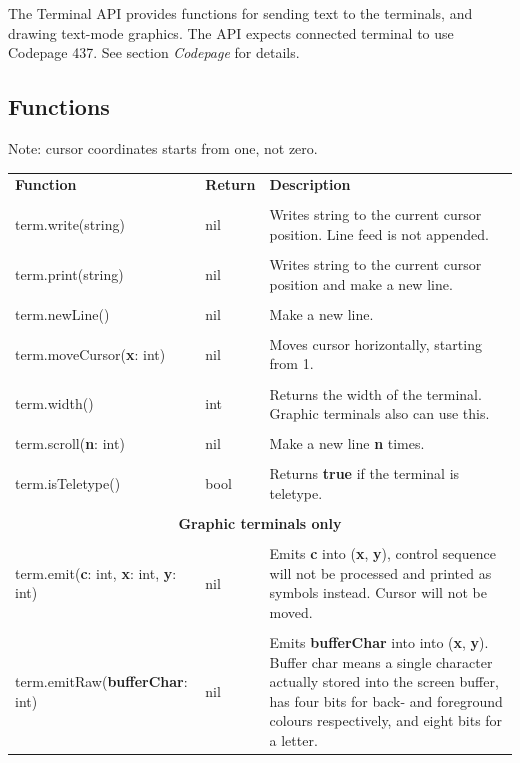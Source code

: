 The Terminal API provides functions for sending text to the terminals, and drawing text-mode graphics. The API expects connected terminal to use Codepage 437. See section \emph{Codepage} for details.

\subsection{Functions}

Note: cursor coordinates starts from one, not zero.

\begin{tabularx}{\textwidth}{l l X}
	\textbf{\large Function} & \textbf{\large Return} & \textbf{\large Description}
	\\ \\
	\endhead
	term.write(string) & nil & Writes string to the current cursor position. Line feed is not appended.
	\\ \\
	term.print(string) & nil & Writes string to the current cursor position and make a new line.
	\\ \\
	term.newLine() & nil & Make a new line.
	\\ \\
	term.moveCursor(\textbf{x}: int) & nil & Moves cursor horizontally, starting from 1.
	\\ \\
	term.width() & int & Returns the width of the terminal. Graphic terminals also can use this.
	\\ \\
	term.scroll(\textbf{n}: int) & nil & Make a new line \textbf{n} times.
	\\ \\
	term.isTeletype() & bool & Returns \textbf{true} if the terminal is teletype.
	\\ \\
	\multicolumn{3}{c}{\textbf{Graphic terminals only}}
	\\ \\
	term.emit(\textbf{c}: int, \textbf{x}: int, \textbf{y}: int) & nil & Emits \textbf{c} into (\textbf{x}, \textbf{y}), control sequence will not be processed and printed as symbols instead. Cursor will not be moved.
	\\ \\
	term.emitRaw(\textbf{bufferChar}: int) & nil & Emits \textbf{bufferChar} into into (\textbf{x}, \textbf{y}). Buffer char means a single character actually stored into the screen buffer, has four bits for back- and foreground colours respectively, and eight bits for a letter.

\end{tabularx}
